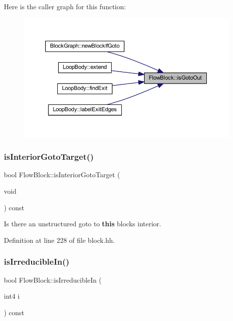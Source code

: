 Here is the caller graph for this function\+:
\nopagebreak
\begin{figure}[H]
\begin{center}
\leavevmode
\includegraphics[width=350pt]{class_flow_block_a338b6b77d5b3e19d7393cc0e8baf5f26_icgraph}
\end{center}
\end{figure}
\mbox{\label{class_flow_block_a7b40aa6b0c04a9f6aad63e3b21edbf20}} 
\subsubsection{\texorpdfstring{isInteriorGotoTarget()}{isInteriorGotoTarget()}}
{\footnotesize\ttfamily bool Flow\+Block\+::is\+Interior\+Goto\+Target (\begin{DoxyParamCaption}\item[{void}]{ }\end{DoxyParamCaption}) const\hspace{0.3cm}{\ttfamily [inline]}}



Is there an unstructured goto to {\bfseries{this}} block\textquotesingle{}s interior. 



Definition at line 228 of file block.\+hh.

\mbox{\label{class_flow_block_ab3166d33e1501e01ad1e597ba7fc5a00}} 
\subsubsection{\texorpdfstring{isIrreducibleIn()}{isIrreducibleIn()}}
{\footnotesize\ttfamily bool Flow\+Block\+::is\+Irreducible\+In (\begin{DoxyParamCaption}\item[{int4}]{i }\end{DoxyParamCaption}) const\hspace{0.3cm}{\ttfamily [inline]}}



